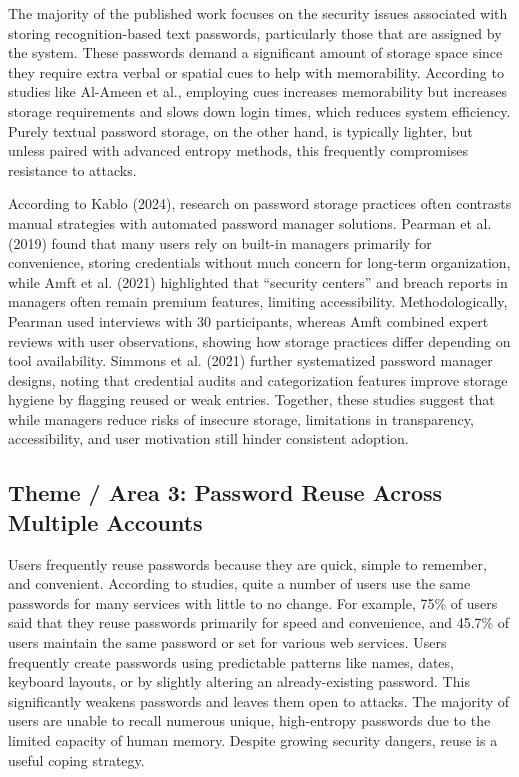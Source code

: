\documentclass[12pt,a4paper]{article}
\begin{document}
\vspace{0.4cm}

The majority of the published work focuses on the security issues associated with storing recognition-based text passwords, particularly those that are assigned by the system. These passwords demand a significant amount of storage space since they require extra verbal or spatial cues to help with memorability. According to studies like Al-Ameen et al., employing cues increases memorability but increases storage requirements and slows down login times, which reduces system efficiency. Purely textual password storage, on the other hand, is typically lighter, but unless paired with advanced entropy methods, this frequently compromises resistance to attacks.

\vspace{0.4cm}

According to Kablo (2024), research on password storage practices often contrasts manual strategies with automated password manager solutions. Pearman et al. (2019) found that many users rely on built-in managers primarily for convenience, storing credentials without much concern for long‑term organization, while Amft et al. (2021) highlighted that “security centers” and breach reports in managers often remain premium features, limiting accessibility. Methodologically, Pearman used interviews with 30 participants, whereas Amft combined expert reviews with user observations, showing how storage practices differ depending on tool availability. Simmons et al. (2021) further systematized password manager designs, noting that credential audits and categorization features improve storage hygiene by flagging reused or weak entries. Together, these studies suggest that while managers reduce risks of insecure storage, limitations in transparency, accessibility, and user motivation still hinder consistent adoption.



\subsection{Theme / Area 3: Password Reuse Across Multiple Accounts}

Users frequently reuse passwords because they are quick, simple to remember, and convenient. According to studies, quite a number of users use the same passwords for many services with little to no change. For example, 75\% of users said that they reuse passwords primarily for speed and convenience, and 45.7\% of users maintain the same password or set for various web services. Users frequently create passwords using predictable patterns like names, dates, keyboard layouts, or by slightly altering an already-existing password. This significantly weakens passwords and leaves them open to attacks. The majority of users are unable to recall numerous unique, high-entropy passwords due to the limited capacity of human memory. Despite growing security dangers, reuse is a useful coping strategy.
\end{document}
